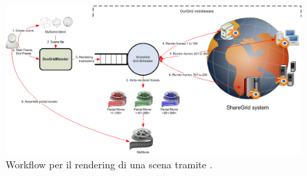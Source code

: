 \begin{figure}
\centering
\includegraphics[scale=0.40]{images/DcsShareGridBlender_Block}
\caption{Workflow per il rendering di una scena tramite \mgTheApp{}.}
\label{fig:intro-workflow}
\end{figure}
